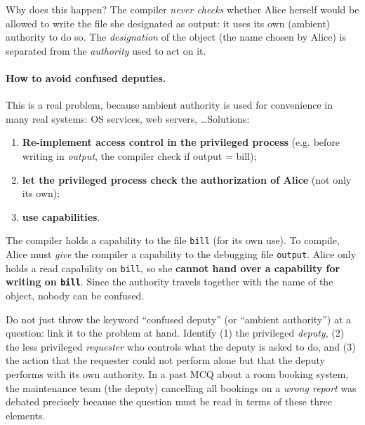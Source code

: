 Why does this happen? The compiler \emph{never checks} whether Alice herself would be allowed to write the file she designated as output: it uses its own (ambient) authority to do so. The \emph{designation} of the object (the name chosen by Alice) is separated from the \emph{authority} used to act on it.

\paragraph{How to avoid confused deputies.} This is a real problem, because ambient authority is used for convenience in many real systems: OS services, web servers, \dots Solutions:
\begin{enumerate}
    \item \textbf{Re-implement access control in the privileged process} (e.g. before writing in \textit{output}, the compiler check if output = bill);
    \item \textbf{let the privileged process check the authorization of Alice} (not only its own);
    \item \textbf{use capabilities}.
\end{enumerate}

\begin{example}
The compiler holds a capability to the file \texttt{bill} (for its own use). To compile, Alice must \emph{give} the compiler a capability to the debugging file \texttt{output}. Alice only holds a read capability on \texttt{bill}, so she \textbf{cannot hand over a capability for writing on \texttt{bill}}. Since the authority travels together with the name of the object, nobody can be confused.
\end{example}

\begin{remark}
Do not just throw the keyword ``confused deputy'' (or ``ambient authority'') at a question: link it to the problem at hand. Identify (1) the privileged \emph{deputy}, (2) the less privileged \emph{requester} who controls what the deputy is asked to do, and (3) the action that the requester could not perform alone but that the deputy performs with its own authority. In a past MCQ about a room booking system, the maintenance team (the deputy) cancelling all bookings on a \emph{wrong report} was debated precisely because the question must be read in terms of these three elements.
\end{remark}

